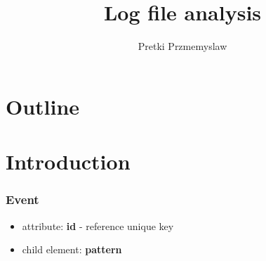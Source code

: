 \documentclass{beamer}
\title{Log file analysis}
\author{Pretki Przmemyslaw}
\begin{document}
\section*{Outline}
\begin{frame}
  \tableofcontents
\end{frame}


\section{Introduction}
\begin{frame}
  \frametitle{Event}
  \begin{itemize}
    \item attribute: \textbf{id} - reference unique key
    \item child element: \textbf{pattern}
\end{itemize}
\end{frame}
\end{document}
